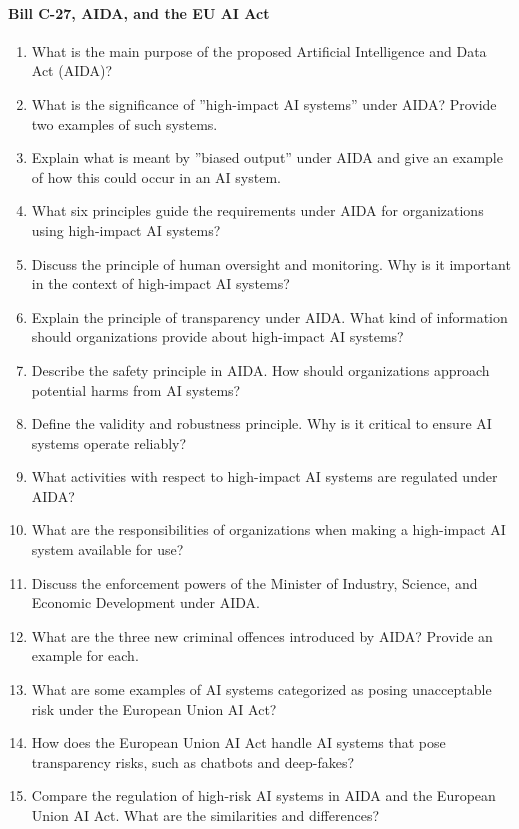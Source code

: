 \paragraph*{Bill C-27, AIDA, and the EU AI Act}
\begin{enumerate}
	\item What is the main purpose of the proposed Artificial Intelligence and Data Act (AIDA)?
	\item What is the significance of ''high-impact AI systems'' under AIDA? Provide two examples of such systems.
	\item Explain what is meant by ''biased output'' under AIDA and give an example of how this could occur in an AI system.
	\item What six principles guide the requirements under AIDA for organizations using high-impact AI systems?
	\item Discuss the principle of human oversight and monitoring. Why is it important in the context of high-impact AI systems?
	\item Explain the principle of transparency under AIDA. What kind of information should organizations provide about high-impact AI systems?
	\item Describe the safety principle in AIDA. How should organizations approach potential harms from AI systems?
	\item Define the validity and robustness principle. Why is it critical to ensure AI systems operate reliably?

	\item What activities with respect to high-impact AI systems are regulated under AIDA?
	\item What are the responsibilities of organizations when making a high-impact AI system available for use?

	\item Discuss the enforcement powers of the Minister of Industry, Science, and Economic Development under AIDA.
	\item What are the three new criminal offences introduced by AIDA? Provide an example for each.

	\item What are some examples of AI systems categorized as posing unacceptable risk under the European Union AI Act?
	\item How does the European Union AI Act handle AI systems that pose transparency risks, such as chatbots and deep-fakes?
	\item Compare the regulation of high-risk AI systems in AIDA and the European Union AI Act. What are the similarities and differences?
\end{enumerate}

